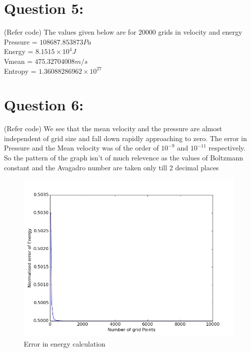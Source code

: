 \documentclass[11pt, a4paper]{article}
\begin{document}
\section{Question 5:}
(Refer code)
The values  given below are for 20000 grids in velocity and energy \\
Pressure = $108687.853873 Pa$ \\
Energy = $8.1515 \times 10^4 J$ \\
Vmean = $475.32704008 m/s$ \\
Entropy = $1.36088286962 \times 10^27$\\


\section{Question 6:}
(Refer code)
We see that the mean velocity and the pressure are almost independent of grid size and fall down rapidly approaching to zero. The error in Pressure and the Mean 
velocity was of the order of $10^{-9}$ and $10^{-11}$ respectively. So the pattern of the graph isn't of much relevence
as the values of Boltzmann constant and the Avagadro number are taken only till 2 decimal places

\begin{figure}[H]
 \centering
 \includegraphics[width = \textwidth]{Q6energy.png}
 \caption{Error in energy calculation}
 \label{fig:energy_error}
\end{figure}
\end{document}
